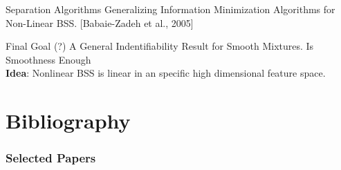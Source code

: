 \documentclass[usenames,dvipsnames]{beamer}
\begin{document}
\begin{frame}


\begin{exampleblock}{Separation Algorithms}
	\vspace{0.2cm}
	Generalizing Information Minimization Algorithms for Non-Linear BSS.  \scriptsize{[Babaie-Zadeh et al., 2005]}
\end{exampleblock}



\pause
	\begin{alertblock}{Final Goal (?)}
		A General Indentifiability Result for Smooth Mixtures. Is Smoothness Enough\\
		 \textbf{Idea}: Nonlinear BSS is linear in an specific high dimensional feature space.
	\end{alertblock}

\end{frame}

\section{Bibliography}
\begin{frame}[t, allowframebreaks]
\frametitle{Selected Papers}
\scriptsize{

\nocite{shahram,TCL, PCL,comon2010handbook, babaie2005general}

}
\end{frame}

\end{document}
